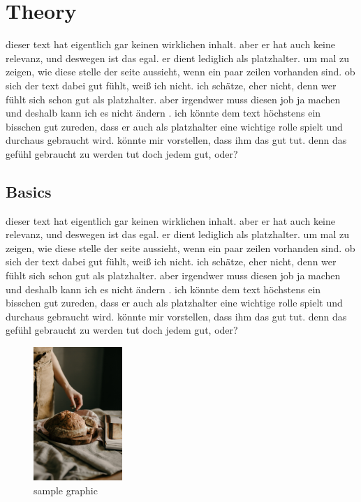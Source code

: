 



\chapter{Theory}
\label{ch:theory}
dieser text hat eigentlich gar keinen wirklichen inhalt. aber er hat auch keine relevanz, und deswegen ist das egal. er dient lediglich als platzhalter. um mal zu zeigen, wie diese stelle der seite aussieht, wenn ein paar zeilen vorhanden sind. ob sich der text dabei gut fühlt, weiß ich nicht. ich schätze, eher nicht, denn wer fühlt sich schon gut als platzhalter. aber irgendwer muss diesen job ja machen und deshalb kann ich es nicht ändern . ich könnte dem text höchstens ein bisschen gut zureden, dass er auch als platzhalter eine wichtige rolle spielt und durchaus gebraucht wird. könnte mir vorstellen, dass ihm das gut tut. denn das gefühl gebraucht zu werden tut doch jedem gut, oder?

\section{Basics}
\label{sec:basics}
dieser text hat eigentlich gar keinen wirklichen inhalt. aber er hat auch keine relevanz, und deswegen ist das egal. er dient lediglich als platzhalter. um mal zu zeigen, wie diese stelle der seite aussieht, wenn ein paar zeilen vorhanden sind. ob sich der text dabei gut fühlt, weiß ich nicht. ich schätze, eher nicht, denn wer fühlt sich schon gut als platzhalter. aber irgendwer muss diesen job ja machen und deshalb kann ich es nicht ändern . ich könnte dem text höchstens ein bisschen gut zureden, dass er auch als platzhalter eine wichtige rolle spielt und durchaus gebraucht wird. könnte mir vorstellen, dass ihm das gut tut. denn das gefühl gebraucht zu werden tut doch jedem gut, oder?

\begin{figure}[t]
    \centering
    \includegraphics[width=0.3\textwidth]{chapter2/img/pexels-marta-dzedyshko-7175450.jpg}
    \caption{sample graphic}
    \label{fig:my_label}
\end{figure}


